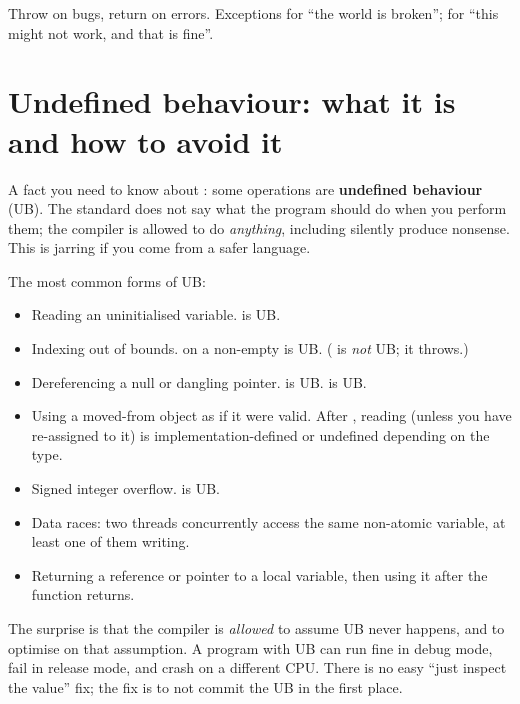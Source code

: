 \begin{idea}
Throw on bugs, return on errors. Exceptions for ``the world is
broken'';  for ``this might not work, and that
is fine''.
\end{idea}

\section{Undefined behaviour: what it is and how to avoid it}
\label{sec:cpp:ub}

A fact you need to know about \cpp{}: some operations are
\textbf{undefined behaviour} (UB). The standard does not say what
the program should do when you perform them; the compiler is
allowed to do \emph{anything}, including silently produce nonsense.
This is jarring if you come from a safer language.

The most common forms of UB:

\begin{itemize}[leftmargin=*]
  \item Reading an uninitialised variable. 
    is UB.
  \item Indexing out of bounds.  on a non-empty
     is UB. ( is \emph{not} UB; it
    throws.)
  \item Dereferencing a null or dangling pointer.  is UB.  is UB.
  \item Using a moved-from object as if it were valid. After
    , reading  (unless you
    have re-assigned to it) is implementation-defined or undefined
    depending on the type.
  \item Signed integer overflow.  is UB.
  \item Data races: two threads concurrently access the same
    non-atomic variable, at least one of them writing.
  \item Returning a reference or pointer to a local variable, then
    using it after the function returns.
\end{itemize}

The surprise is that the compiler is \emph{allowed} to assume UB
never happens, and to optimise on that assumption. A program with
UB can run fine in debug mode, fail in release mode, and crash on a
different CPU. There is no easy ``just inspect the value'' fix; the
fix is to not commit the UB in the first place.

